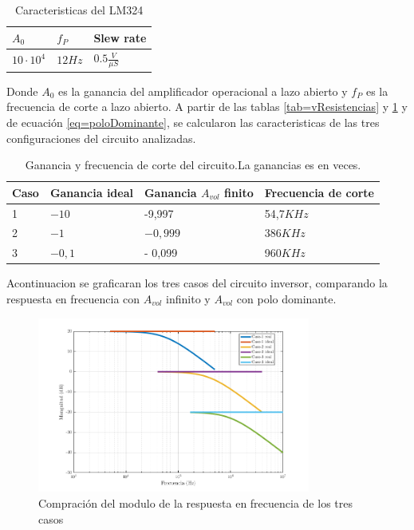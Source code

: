 \documentclass[../../main.tex]{subfiles}
\begin{document}
\begin{table}[h]
\begin{center}
\begin{tabular}{|l|l|l|}
\hline
$A_{0}$ & $f_{P}$ & Slew rate \\
\hline \hline
$10\cdot 10^{4}$& $ 12Hz $ & $0.5 \frac{V}{\mu S}$\\ \hline

\end{tabular}
\caption{Caracteristicas del LM324} 
\label{tab=lm324Carac}
\end{center}
\end{table}
Donde $A_{0}$ es la ganancia del amplificador operacional a lazo abierto y  $f_{P}$ es la frecuencia de corte a lazo abierto. A partir de las tablas \ref{tab=vResistencias} y \ref{tab=lm324Carac} y de ecuación  \ref{eq=poloDominante}, se calcularon las caracteristicas de las tres configuraciones del circuito analizadas.

\begin{table}[h]
\begin{center}
\begin{tabular}{|l|l|l|l|}
\hline
Caso &Ganancia ideal & Ganancia $A_{vol}$ finito & Frecuencia de corte\\
\hline \hline
1 & $-10$ & -9,997 & 54,7$KHz$ \\ \hline
2 & $-1$ &  $-0,999 $ &  386$KHz$  \\ \hline
3 & $-0,1$ &- 0,099 &960$KHz$\\ \hline
\end{tabular}
\caption{Ganancia y frecuencia de corte del circuito.La ganancias es en veces.} 
\label{tab=gananciayFrecCorte}
\end{center}
\end{table}

Acontinuacion se graficaran los tres casos del circuito inversor, comparando la respuesta en frecuencia con  $A_{vol}$ infinito y $A_{vol}$ con polo dominante.

\begin{figure}[H]
\centering
\includegraphics[width=0.8\textwidth]{real_ideal_mag_inv}
\caption{Compración del modulo de la respuesta en frecuencia de los tres casos}
\end{figure}
\end{document}
